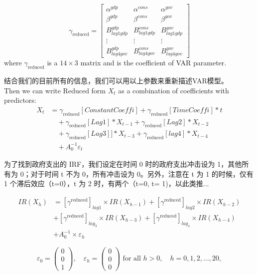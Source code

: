 \documentclass{article}
\begin{document}
\begin{CJK}{UTF8}{gbsn}
\begin{equation}
    \gamma_{\text{reduced}} = 
    \begin{bmatrix}
        \alpha^{gdp} & \alpha^{cons} & \alpha^{gov} \\
        \beta^{gdp} & \beta^{cons} & \beta^{gov} \\
        B^{gdp}_{lag1gdp} & B^{cons}_{lag1gdp} & B^{gov}_{lag1gdp} \\
        \vdots & \vdots & \vdots \\
        B^{gdp}_{lag4gov} & B^{cons}_{lag4gov} & B^{gov}_{lag4gov}
    \end{bmatrix}
\end{equation}
where $\gamma_{\text{reduced}}$ is a $14 \times 3$ matrix and is the coefficient of VAR parameter.

结合我们的目前所有的信息，我们可以用以上参数来重新描述VAR模型。\\

Then we can write Reduced form $X_t$ as a combination of coefficients with predictors:
\begin{align*}
    X_t &= \gamma_{\text{reduced}}[Constant Coeffi] + \gamma_{\text{reduced}}[Time Coeffi]*t  \\
    &\quad + \gamma_{\text{reduced}}[Lag1]* X_{t-1} + \gamma_{\text{reduced}}[Lag2]* X_{t-2} \\
    &\quad + \gamma_{\text{reduced}}[Lag3]]*X_{t-3} + \gamma_{\text{reduced}}[lag4]*X_{t-4}\\
    &\quad + A_0^{-1} \varepsilon_t
\end{align*}

为了找到政府支出的 IRF，我们设定在时间 0 时的政府支出冲击设为 1，其他所有为 0；对于时间 t 不为 0，所有冲击设为 0。另外，注意在 t 为 1 的时候，仅有 1 个滞后效应（t=0），t 为 2 时，有两个（t=0, t= 1)，以此类推...

\begin{align*}
IR(X_h) &= [\gamma^{\text{reduced}}]_{lag1} \times IR(X_{h-1}) + [\gamma^{\text{reduced}}]_{lag2} \times IR(X_{h-2}) \\
&+ [\gamma^{\text{reduced}}]_{lag_3} \times IR(X_{h-3}) + [\gamma^{\text{reduced}}]_{lag_4} \times IR(X_{h-4}) \\
&+ A_0^{-1} \times \varepsilon_h
\end{align*}

\begin{equation}
    \varepsilon_0 = \begin{pmatrix} 0 \\ 0 \\ 1 \end{pmatrix}, \quad
    \varepsilon_h = \begin{pmatrix} 0 \\ 0 \\ 0 \end{pmatrix} \text{ for all } h > 0, \quad h = 0, 1, 2, \ldots, 20,
\end{equation}


\end{CJK}
\end{document}
